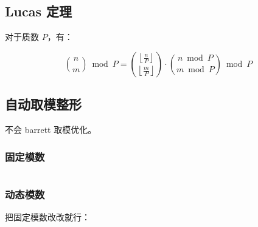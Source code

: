 \inputminted[mathescape]{cpp}{math/gcd/fast_gcd.cpp}

\subsection{Lucas 定理}

对于质数 $P$，有：

\[
\binom{n}{m}\bmod P =
\binom{\left\lfloor\frac{n}{P}\right\rfloor}{\left\lfloor\frac{m}{P}\right\rfloor}
\cdot \binom{n\bmod P}{m\bmod P}\bmod P
\]

\subsection{自动取模整形}

不会 barrett 取模优化。

\subsubsection{固定模数}

\inputminted{cpp}{math/modint/static_modint.cpp}

\subsubsection{动态模数}

把固定模数改改就行：

\inputminted{diff}{math/modint/diff}
